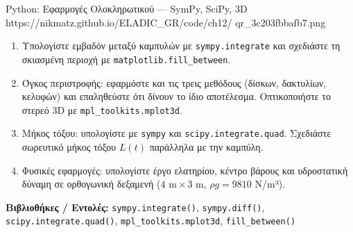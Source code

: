 \begin{pybox}{Python: Εφαρμογές Ολοκληρωτικού — SymPy, SciPy, 3D}%
             {https://nikmatz.github.io/ELADIC_GR/code/ch12/}%
             {qr_3c203fbbafb7.png}
\label{py:ch12_integral_apps}
\begin{enumerate}[label=(\alph*),itemsep=2pt]
  \item Υπολογίστε εμβαδόν μεταξύ καμπυλών με
    \texttt{sympy.integrate} και σχεδιάστε τη σκιασμένη
    περιοχή με \texttt{matplotlib.fill\_between}.
  \item Όγκος περιστροφής: εφαρμόστε και τις τρεις
    μεθόδους (δίσκων, δακτυλίων, κελυφών) και επαληθεύστε
    ότι δίνουν το ίδιο αποτέλεσμα. Οπτικοποιήστε το στερεό
    3D με \texttt{mpl\_toolkits.mplot3d}.
  \item Μήκος τόξου: υπολογίστε με \texttt{sympy} και
    \texttt{scipy.integrate.quad}. Σχεδιάστε σωρευτικό
    μήκος τόξου $L(t)$ παράλληλα με την καμπύλη.
  \item Φυσικές εφαρμογές: υπολογίστε έργο ελατηρίου,
    κέντρο βάρους και υδροστατική δύναμη σε ορθογωνική
    δεξαμενή ($4\text{ m}\times 3\text{ m}$, $\rho g=9810$ N/m³).
\end{enumerate}
\medskip
\textbf{Βιβλιοθήκες / Εντολές:}
\texttt{sympy.integrate()}, \texttt{sympy.diff()},
\texttt{scipy.integrate.quad()},
\texttt{mpl\_toolkits.mplot3d}, \texttt{fill\_between()}
\end{pybox}
